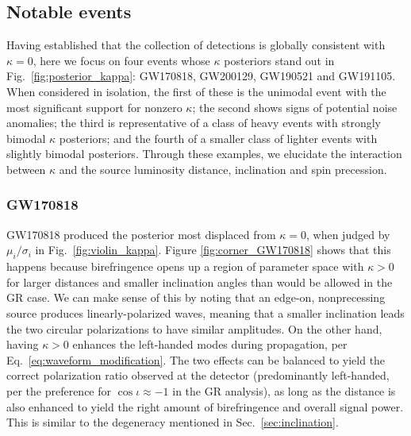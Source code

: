 \documentclass[aps,prd,twocolumn,superscriptaddress,preprintnumbers,floatfix,nofootinbib]{revtex4-2}
\begin{document}
\subsection{Notable events}
\label{sec:notable}

Having established that the collection of detections is globally consistent with $\kappa=0$, here we focus on four events whose $\kappa$ posteriors stand out in Fig.~\ref{fig:posterior_kappa}: GW170818, GW200129, GW190521 and GW191105.
%
When considered in isolation, the first of these is the unimodal event with the most significant support for nonzero $\kappa$; the second shows signs of potential noise anomalies; the third is representative of a class of heavy events with strongly bimodal $\kappa$ posteriors; and the fourth of a smaller class of lighter events with slightly bimodal posteriors.
Through these examples, we elucidate the interaction between $\kappa$ and the source luminosity distance, inclination and spin precession.

\subsubsection{GW170818}
\label{sec:GW170818}

GW170818 produced the posterior most displaced from $\kappa=0$, when judged by $\mu_i/\sigma_i$ in Fig.~\ref{fig:violin_kappa}.
Figure \ref{fig:corner_GW170818} shows that this happens because birefringence opens up a region of parameter space with $\kappa>0$ for larger distances and smaller inclination angles than would be allowed in the GR case.
We can make sense of this by noting that an edge-on, nonprecessing source produces linearly-polarized waves, meaning that a smaller inclination leads the two circular polarizations to have similar amplitudes.
On the other hand, having $\kappa > 0$ enhances the left-handed modes during propagation, per Eq.~\eqref{eq:waveform_modification}.
The two effects can be balanced to yield the correct polarization ratio observed at the detector (predominantly left-handed, per the preference for $\cos\iota \approx -1$ in the \ac{GR} analysis), as long as the distance is also enhanced to yield the right amount of birefringence and overall signal power.
This is similar to the degeneracy mentioned in Sec.~\ref{sec:inclination}.
\end{document}
